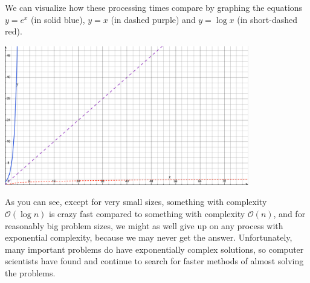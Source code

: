 \documentclass[12pt]{amsbook}
\begin{document}
We can visualize how these processing times compare by graphing the
equations $y=e^x$ (in solid blue), $y=x$ (in dashed purple) and $y=\log x$ (in short-dashed red).
\begin{center}
\includegraphics[width=0.8\textwidth]{Complexity.pdf}
\end{center}
As you can see,
except for very small sizes,
something with complexity $\mathcal{O}(\log n)$ is crazy fast compared 
to something with complexity $\mathcal{O}(n)$,
and for reasonably big problem sizes,
we might as well give up on any process with exponential complexity,
because we may never get the answer.
Unfortunately, many important problems do have exponentially complex solutions,
so computer scientists have found and continue to search for faster methods of
almost solving the problems.
\end{document}
